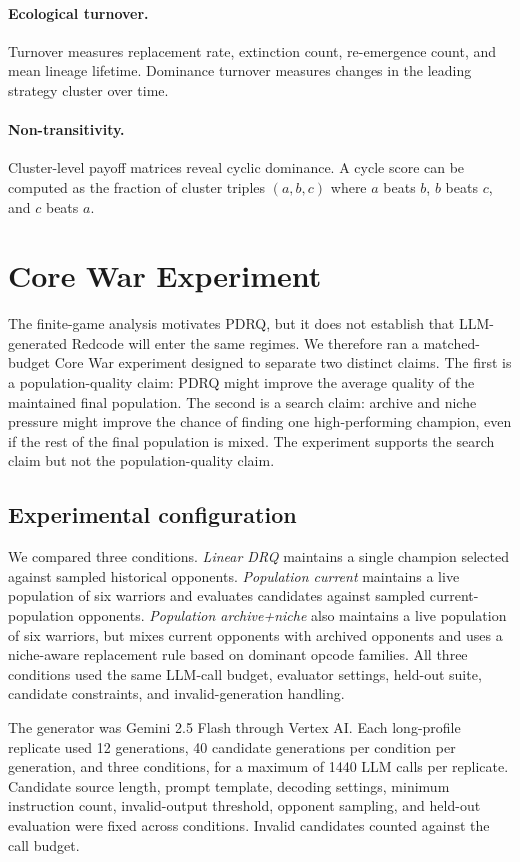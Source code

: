 \documentclass[11pt]{article}
\begin{document}
\paragraph{Ecological turnover.}
Turnover measures replacement rate, extinction count, re-emergence count, and mean lineage lifetime. Dominance turnover measures changes in the leading strategy cluster over time.

\paragraph{Non-transitivity.}
Cluster-level payoff matrices reveal cyclic dominance. A cycle score can be computed as the fraction of cluster triples $(a,b,c)$ where $a$ beats $b$, $b$ beats $c$, and $c$ beats $a$.

\section{Core War Experiment}

The finite-game analysis motivates PDRQ, but it does not establish that LLM-generated Redcode will enter the same regimes. We therefore ran a matched-budget Core War experiment designed to separate two distinct claims. The first is a population-quality claim: PDRQ might improve the average quality of the maintained final population. The second is a search claim: archive and niche pressure might improve the chance of finding one high-performing champion, even if the rest of the final population is mixed. The experiment supports the search claim but not the population-quality claim.

\subsection{Experimental configuration}

We compared three conditions. \emph{Linear DRQ} maintains a single champion selected against sampled historical opponents. \emph{Population current} maintains a live population of six warriors and evaluates candidates against sampled current-population opponents. \emph{Population archive+niche} also maintains a live population of six warriors, but mixes current opponents with archived opponents and uses a niche-aware replacement rule based on dominant opcode families. All three conditions used the same LLM-call budget, evaluator settings, held-out suite, candidate constraints, and invalid-generation handling.

The generator was Gemini 2.5 Flash through Vertex AI. Each long-profile replicate used 12 generations, 40 candidate generations per condition per generation, and three conditions, for a maximum of 1440 LLM calls per replicate. Candidate source length, prompt template, decoding settings, minimum instruction count, invalid-output threshold, opponent sampling, and held-out evaluation were fixed across conditions. Invalid candidates counted against the call budget.
\end{document}
